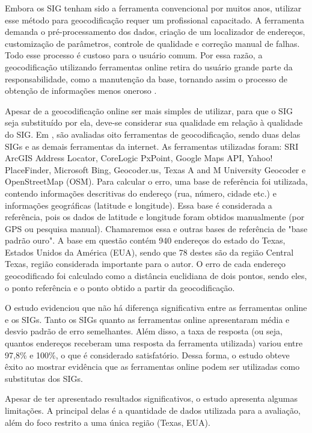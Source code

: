 Embora os SIG tenham sido a ferramenta convencional por muitos anos, utilizar esse método para geocodificação requer um profissional capacitado. A ferramenta demanda o pré-processamento dos dados, criação de um localizador de endereços, customização de parâmetros, controle de qualidade e correção manual de falhas. Todo esse processo é custoso para o usuário comum. Por essa razão, a geocodificação utilizando ferramentas online retira do usuário grande parte da responsabilidade, como a manutenção da base, tornando assim o processo de obtenção de informações menos oneroso \cite{Chow2016}.

Apesar de a geocodificação online ser mais simples de utilizar, para que o SIG seja substituído por ela, deve-se considerar sua qualidade em relação à qualidade do SIG. Em \cite{Chow2016}, são avaliadas oito ferramentas de geocodificação, sendo duas delas SIGs e as demais ferramentas da internet. As ferramentas utilizadas foram: SRI ArcGIS Address Locator, CoreLogic PxPoint, Google Maps API, Yahoo! PlaceFinder, Microsoft Bing, Geocoder.us, Texas A and M University Geocoder e OpenStreetMap (OSM). Para calcular o erro, uma base de referência foi utilizada, contendo informações descritivas do endereço (rua, número, cidade etc.) e informações geográficas (latitude e longitude). Essa base é considerada a referência, pois os dados de latitude e longitude foram obtidos manualmente (por GPS ou pesquisa manual). Chamaremos essa e outras bases de referência de "base padrão ouro". A base em questão contém 940 endereços do estado do Texas, Estados Unidos da América (EUA), sendo que 78 destes são da região Central Texas, região considerada importante para o autor. O erro de cada endereço geocodificado foi calculado como a distância euclidiana de dois pontos, sendo eles, o ponto referência e o ponto obtido a partir da geocodificação.

O estudo evidenciou que não há diferença significativa entre as ferramentas online e os SIGs. Tanto os SIGs quanto as ferramentas online apresentaram média e desvio padrão de erro semelhantes. Além disso, a taxa de resposta (ou seja, quantos endereços receberam uma resposta da ferramenta utilizada) variou entre 97,8\% e 100\%, o que é considerado satisfatório. Dessa forma, o estudo obteve êxito ao mostrar evidência que as ferramentas online podem ser utilizadas como substitutas dos SIGs.

Apesar de \cite{Chow2016} ter apresentado resultados significativos, o estudo apresenta algumas limitações. A principal delas é a quantidade de dados utilizada para a avaliação, além do foco restrito a uma única região (Texas, EUA). 

